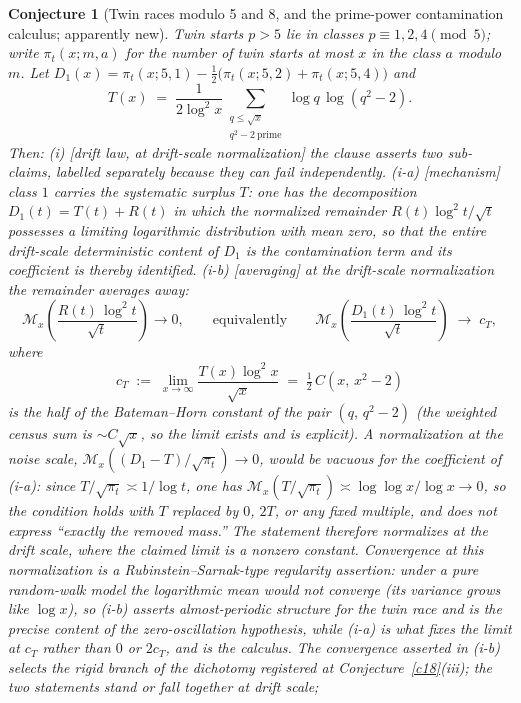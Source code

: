 \documentclass[11pt]{article}
\newtheorem{conjecture}{Conjecture}
\theoremstyle{definition}
\newcommand{\M}{\mathcal M}
\begin{document}
\setcounter{conjecture}{0}%
\begin{conjecture}[Twin races modulo 5 and 8, and the prime-power
contamination calculus; apparently new]\label{c21}
Twin starts $p>5$ lie in classes $p\equiv1,2,4\pmod5$; write $\pi_t(x;m,a)$ for the number of twin starts at most $x$ in the class $a$ modulo $m$.  Let
$D_1(x)=\pi_t(x;5,1)-\tfrac12\bigl(\pi_t(x;5,2)+\pi_t(x;5,4)\bigr)$
and
\[
T(x)\;=\;\frac1{2\log^2x}
\sum_{\substack{q\le\sqrt x\\ q^2-2\ \mathrm{prime}}}
\log q\,\log(q^2-2).
\]
Then:
\emph{(i)} [drift law, at drift-scale normalization] the clause
asserts two sub-claims, labelled separately because they can fail
independently.
\emph{(i-a)} [mechanism] class $1$ carries the systematic surplus
$T$: one has the decomposition $D_1(t)=T(t)+R(t)$ in which the
normalized remainder $R(t)\log^2t/\sqrt t$ possesses a limiting
logarithmic distribution with mean zero, so that the entire drift-scale deterministic content of $D_1$ is the
contamination term and its coefficient is thereby identified.
\emph{(i-b)} [averaging] at the drift-scale normalization the
remainder averages away:
\[
\M_x\!\left(\frac{R(t)\,\log^2t}{\sqrt t}\right)\longrightarrow0,
\qquad\text{equivalently}\qquad
\M_x\!\left(\frac{D_1(t)\,\log^2t}{\sqrt t}\right)
\;\longrightarrow\;c_T,
\]
where
\[
c_T\;:=\;\lim_{x\to\infty}\frac{T(x)\log^2x}{\sqrt x}
\;=\;\tfrac12\,C(x,\,x^2-2)
\]
is the half of the Bateman--Horn constant of the pair $(q,\,q^2-2)$
(the weighted census sum is $\sim C\sqrt x$, so the limit exists and
is explicit).  A normalization
at the noise scale, $\M_x((D_1-T)/\sqrt{\pi_t})\to0$, would be
\emph{vacuous} for the coefficient of (i-a): since
$T/\sqrt{\pi_t}\asymp1/\log t$, one has
$\M_x(T/\sqrt{\pi_t})\asymp\log\log x/\log x\to0$, so the condition
holds with $T$ replaced by $0$, $2T$, or any fixed multiple, and
does not express ``exactly the removed mass.''  The statement
therefore normalizes at the \emph{drift} scale, where the claimed
limit is a nonzero constant.  Convergence at this normalization is a
Rubinstein--Sarnak-type regularity assertion: under a pure
random-walk model the logarithmic mean would not converge (its
variance grows like $\log x$), so (i-b) asserts almost-periodic
structure for the twin race and is the precise content of the
zero-oscillation hypothesis, while (i-a) is what fixes the limit at
$c_T$ rather than $0$ or $2c_T$, and is the calculus.  The
convergence asserted in (i-b) selects the rigid branch of the
dichotomy registered at Conjecture~\ref{c18}(iii); the two
statements stand or fall together at drift scale;

\end{conjecture}
\end{document}
